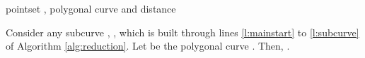 \documentclass[a4paper,UKenglish]{lipics}
\begin{document}
\begin{algorithm}
\begin{algorithmic}[1]
	   \label{l:mainstart}

		\STATE   \label{l:startofL}

		\STATE   \STATE   \label{l:Adduh1toell}
		 \label{l:looptoMakeL}	

	

			 \label{l:makeclausestart}	
\STATE 
\STATE 
			\ELSE		
			\STATE 
			\ENDIF \label{l:makeclauseend}


			\IF {}

			\STATE  \label{l:alpha}

			\STATE  \label{l:beta}
			
			\STATE 


			\ENDIF

		
		\ENDFOR
	
		\STATE  \label{l:subcurve}


		\STATE   
		\STATE  
		   
		
		

	\ENDFOR


	\vspace{0.05in}
\RETURN  pointset , polygonal curve  and distance 
	

\end{algorithmic}
\end{algorithm}












































\begin{lemma}\label{lemma:PathA}
Consider any subcurve , ,  
which is built through lines \ref{l:mainstart} to \ref{l:subcurve} 
of Algorithm \ref{alg:reduction}. Let  be the polygonal curve  . Then, .
\end{lemma}
\end{document}
